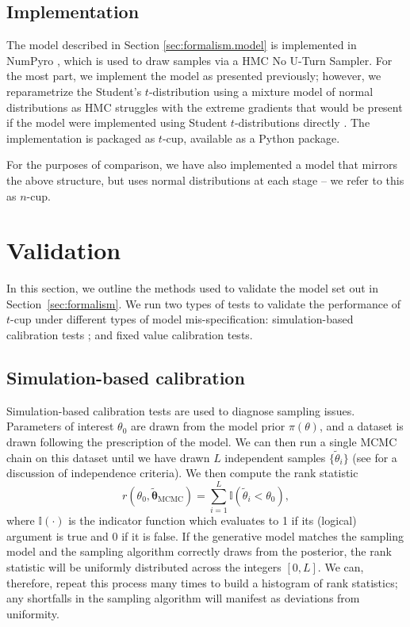 \documentclass[fleqn,usenatbib]{rasti}
\begin{document}
\subsection{Implementation}
\label{sec:formalism.implementation}

The model described in Section \ref{sec:formalism.model} is implemented in
NumPyro \citep{NumPyro, Pyro}, which is used to draw samples via a HMC No U-Turn
Sampler. For the most part, we implement the model as presented previously;
however, we reparametrize the Student's $t$-distribution using a mixture model
of normal distributions \citep[e.g.][]{Stan} as HMC struggles with the extreme
gradients that would be present if the model were implemented using Student
$t$-distributions directly \citep{Neal:2003, Betancourt:2013}.  The implementation
is packaged as $t$-cup, available as a Python package\footnotemark.

For the purposes of comparison, we have also implemented a model that mirrors
the above structure, but uses normal distributions at each stage -- we refer to
this as $n$-cup.


\section{Validation}
\label{sec:methods}

In this section, we outline the methods used to validate the model set out in
Section~\ref{sec:formalism}. We run two types of tests to validate the performance of
$t$-cup under different types of model mis-specification: simulation-based
calibration tests \citep{Cook:2006, Talts:2018}; and fixed value calibration
tests.

\subsection{Simulation-based calibration}
\label{sec:methods.sbc}

Simulation-based calibration tests \citep{Cook:2006, Talts:2018} are used to
diagnose sampling issues. Parameters of interest $\theta_0$ are drawn from the
model prior $\pi(\theta)$, and a dataset is drawn following the prescription of
the model. We can then run a single MCMC chain on this dataset until we have
drawn $L$ independent samples $\{\tilde{\theta}_{i}\}$ (see \citet{Talts:2018}
for a discussion of independence criteria). We then compute the rank statistic
\begin{equation}
    r(\theta_0, \tilde{\boldsymbol{\theta}}_{\text{MCMC}})
        = \sum_{i = 1}^{L} \mathbb I (\tilde{\theta}_i < \theta_0),
\end{equation}
where $\mathbb{I}(\cdot)$ is the indicator function which evaluates to 1 if its (logical) argument is true and 0 if it is false.
If the generative model matches the sampling model and the sampling algorithm
correctly draws from the posterior, the rank statistic will be uniformly
distributed across the integers $[0, L]$. We can, therefore, repeat this process
many times to build a histogram of rank statistics; any shortfalls in the
sampling algorithm will manifest as deviations from uniformity.
\end{document}
